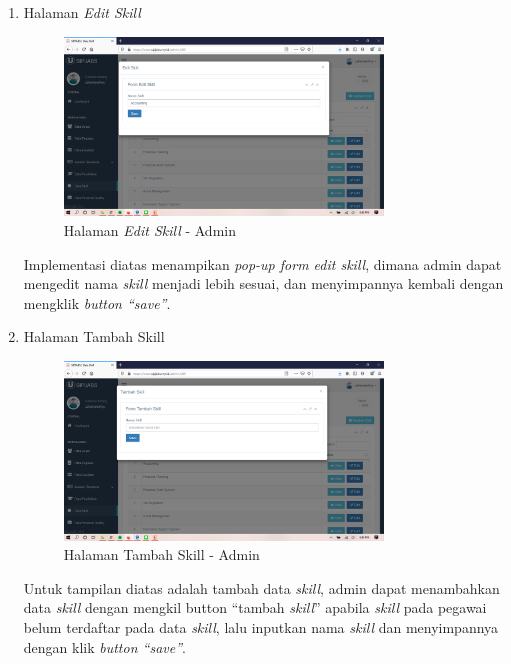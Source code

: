 \begin{enumerate}
	\item Halaman \textit{Edit Skill}
	\begin{figure}
		\centering
		\includegraphics[width=0.8\textwidth]
		{pics/admin/implementasi/editskill.png}
		\caption{Halaman \textit{Edit Skill} - Admin}
		\label{fig:CC10}
	\end{figure}
	Implementasi diatas menampikan \textit{pop-up form edit skill}, dimana admin dapat mengedit nama \textit{skill} menjadi lebih sesuai, dan menyimpannya kembali dengan mengklik \textit{button “save”}.
	
	\item Halaman Tambah Skill
	\begin{figure}
		\centering
		\includegraphics[width=0.8\textwidth]
		{pics/admin/implementasi/tambahskill.png}
		\caption{Halaman Tambah Skill - Admin}
		\label{fig:CC10}
	\end{figure}
	Untuk tampilan diatas adalah tambah data \textit{skill}, admin dapat menambahkan data \textit{skill} dengan mengkil button “tambah \textit{skill}” apabila \textit{skill} pada pegawai belum terdaftar pada data \textit{skill}, lalu inputkan nama \textit{skill} dan menyimpannya dengan klik \textit{button “save”}.
	

\end{enumerate}
